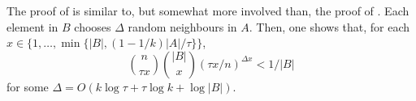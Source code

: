 \documentclass{patmorin}
\begin{document}
%

The proof of  is similar to, but somewhat more involved than, the proof of .
Each element in $B$ chooses $\Delta$ random neighbours in $A$.  Then, one shows that, for each $x\in\{1,\ldots,\min\{|B|, (1-1/k)|A|/\tau\}\}$,
\[
    \binom{n}{\tau x}\binom{|B|}{x}(\tau x/n)^{\Delta x} < 1/|B|
\]
for some $\Delta=O(k\log\tau +\tau\log k + \log|B|)$.
\end{document}
